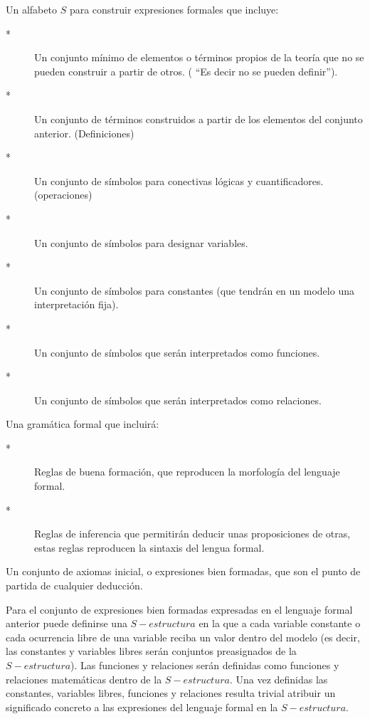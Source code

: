 \begin{lista}

\item Un alfabeto $S$ para construir expresiones formales que incluye:
\begin{description}
\item [{{*}}] Un conjunto mínimo de elementos o términos propios de la
teoría que no se pueden construir a partir de otros. ( ``\textsf{Es
decir no se pueden definir}'').
\item [{{*}}] Un conjunto de términos construidos a partir de los elementos
del conjunto anterior. (Definiciones)
\item [{{*}}] Un conjunto de símbolos para conectivas lógicas y cuantificadores.
(operaciones)
\item [{{*}}] Un conjunto de símbolos para designar variables.
\item [{{*}}] Un conjunto de símbolos para constantes (que tendrán en un
modelo una interpretación fija). 
\item [{{*}}] Un conjunto de símbolos que serán interpretados como funciones. 
\item [{{*}}] Un conjunto de símbolos que serán interpretados como relaciones. 
\end{description}
\item Una gramática formal que incluirá:
\begin{description}
\item [{{*}}] Reglas de buena formación, que reproducen la \textquotedbl{}morfología\textquotedbl{}
del lenguaje formal.
\item [{{*}}] Reglas de inferencia que permitirán deducir unas proposiciones
de otras, estas reglas reproducen la \textquotedbl{}sintaxis\textquotedbl{}
del lengua formal. 
\end{description}
\item Un conjunto de axiomas inicial, o expresiones bien formadas,
que son el punto de partida de cualquier deducción. 

\end{lista}

Para el conjunto de expresiones bien formadas expresadas en el lenguaje
formal anterior puede definirse una $S-estructura$ en la que a cada
variable constante o cada ocurrencia libre de una variable reciba
un valor dentro del modelo (es decir, las constantes y variables libres
serán conjuntos preasignados de la $S-estructura$). Las funciones
y relaciones serán definidas como funciones y relaciones matemáticas
dentro de la $S-estructura$. Una vez definidas las constantes, variables
libres, funciones y relaciones resulta trivial atribuir un significado
concreto a las expresiones del lenguaje formal en la $S-estructura$.



